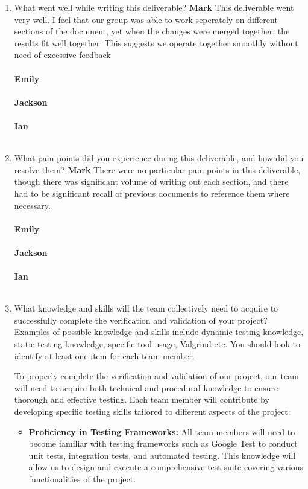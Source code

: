 \documentclass[12pt, titlepage]{article}
\begin{document}
\begin{enumerate}
  \item What went well while writing this deliverable? 
  \textbf{Mark} This deliverable went very well. I feel that our group was able to work seperately on different sections of the document, yet when the changes were merged together, the results fit well together. This suggests we operate together smoothly without need of excessive feedback \\ \\
  \textbf{Emily} \\ \\
  \textbf{Jackson} \\ \\
  \textbf{Ian} \\ \\
  \item What pain points did you experience during this deliverable, and how
    did you resolve them?
    \textbf{Mark} There were no particular pain points in this deliverable, though there was significant volume of writing out each section, and there had to be significant recall of previous documents to reference them where necessary.\\ \\
    \textbf{Emily} \\ \\
    \textbf{Jackson} \\ \\
    \textbf{Ian} \\ \\
  \item What knowledge and skills will the team collectively need to acquire to
  successfully complete the verification and validation of your project?
  Examples of possible knowledge and skills include dynamic testing knowledge,
  static testing knowledge, specific tool usage, Valgrind etc.  You should look to
  identify at least one item for each team member.

  To properly complete the verification and validation of our project, our team will need to acquire both technical and procedural knowledge to ensure thorough and effective testing. Each team member will contribute by developing specific testing skills tailored to different aspects of the project:

  \begin{itemize}
      \item \textbf{Proficiency in Testing Frameworks:} All team members will need to become familiar with testing frameworks such as Google Test to conduct unit tests, integration tests, and automated testing. This knowledge will allow us to design and execute a comprehensive test suite covering various functionalities of the project.
  

\end{itemize}
\end{enumerate}
\end{document}
